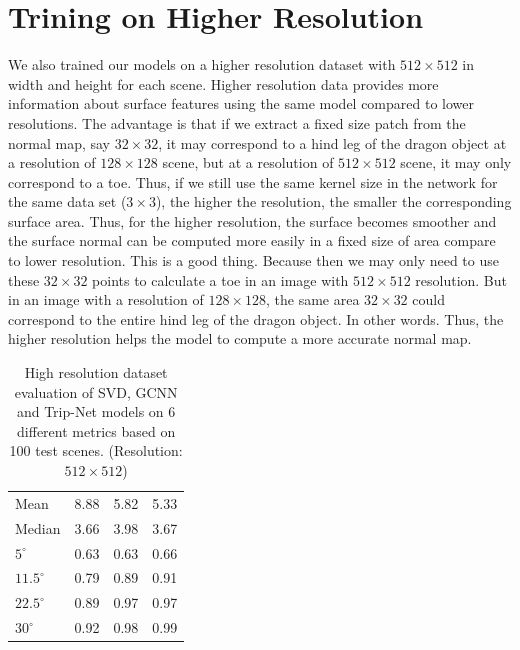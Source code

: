 \section{Trining on Higher Resolution}
We also trained our models on a higher resolution dataset with $ 512 \times 512 $ in width and height for each scene. Higher resolution data provides more information about surface features using the same model compared to lower resolutions. The advantage is that if we extract a fixed size patch from the normal map, say $32\times32$, it may correspond to a hind leg of the dragon object at a resolution of $128 \times 128$ scene, but at a resolution of $512\times 512$ scene, it may only correspond to a toe. Thus, if we still use the same kernel size in the network for the same data set ($ 3\times 3 $), the higher the resolution, the smaller the corresponding surface area. 
Thus, for the higher resolution, the surface becomes smoother and the surface normal can be computed more easily in a fixed size of area compare to lower resolution. This is a good thing. Because then we may only need to use these $ 32\times 32 $ points to calculate a toe in an image with $ 512\times512 $ resolution. But in an image with a resolution of $ 128\times128 $, the same area $ 32\times32 $ could correspond to the entire hind leg of the dragon object. In other words. Thus, the higher resolution helps the model to compute a more accurate normal map. 


\begin{table}[H]
	\centering
	\captionsetup{width=\linewidth}
	\begin{tabular}{l | l l l }
		\toprule
		\tabhead{Metrics} & \tabhead{SVD} & \tabhead{GCNN} & \tabhead{Trip-Net} \\
		\midrule
		Mean  					& 8.88 & 5.82 & 5.33 \\ 
		\hline
		Median					& 3.66 & 3.98 & 3.67 \\ 
		\hline
		$ 5^\circ $ 			& 0.63 & 0.63 & 0.66 \\
		\hline
		$ 11.5^\circ $ 			& 0.79 & 0.89 & 0.91 \\
		\hline
		$ 22.5^\circ $ 			& 0.89 & 0.97 & 0.97 \\
		\hline
		$ 30^\circ $ 			& 0.92 & 0.98 & 0.99 \\
		\bottomrule
	\end{tabular}
	\caption{High resolution dataset evaluation of SVD, GCNN and Trip-Net models on 6 different metrics based on 100 test scenes. (Resolution: $ 512\times512 $)}	
	\label{tab:high_resolution_eval}
\end{table}

